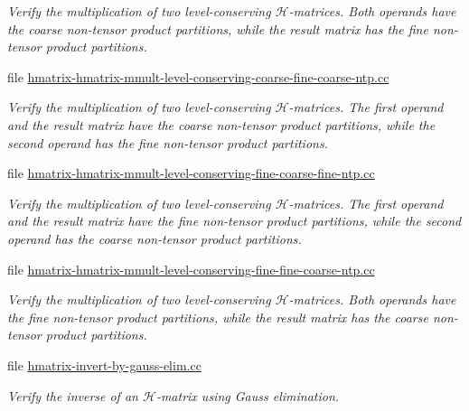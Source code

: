 \begin{DoxyCompactItemize}
\begin{DoxyCompactList}\small\item\em Verify the multiplication of two level-\/conserving $\mathcal{H}$-\/matrices. Both operands have the coarse non-\/tensor product partitions, while the result matrix has the fine non-\/tensor product partitions. \end{DoxyCompactList}\item 
file \hyperlink{hmatrix-hmatrix-mmult-level-conserving-coarse-fine-coarse-ntp_8cc}{hmatrix-\/hmatrix-\/mmult-\/level-\/conserving-\/coarse-\/fine-\/coarse-\/ntp.\+cc}
\begin{DoxyCompactList}\small\item\em Verify the multiplication of two level-\/conserving $\mathcal{H}$-\/matrices. The first operand and the result matrix have the coarse non-\/tensor product partitions, while the second operand has the fine non-\/tensor product partitions. \end{DoxyCompactList}\item 
file \hyperlink{hmatrix-hmatrix-mmult-level-conserving-fine-coarse-fine-ntp_8cc}{hmatrix-\/hmatrix-\/mmult-\/level-\/conserving-\/fine-\/coarse-\/fine-\/ntp.\+cc}
\begin{DoxyCompactList}\small\item\em Verify the multiplication of two level-\/conserving $\mathcal{H}$-\/matrices. The first operand and the result matrix have the fine non-\/tensor product partitions, while the second operand has the coarse non-\/tensor product partitions. \end{DoxyCompactList}\item 
file \hyperlink{hmatrix-hmatrix-mmult-level-conserving-fine-fine-coarse-ntp_8cc}{hmatrix-\/hmatrix-\/mmult-\/level-\/conserving-\/fine-\/fine-\/coarse-\/ntp.\+cc}
\begin{DoxyCompactList}\small\item\em Verify the multiplication of two level-\/conserving $\mathcal{H}$-\/matrices. Both operands have the fine non-\/tensor product partitions, while the result matrix has the coarse non-\/tensor product partitions. \end{DoxyCompactList}\item 
file \hyperlink{hmatrix-invert-by-gauss-elim_8cc}{hmatrix-\/invert-\/by-\/gauss-\/elim.\+cc}
\begin{DoxyCompactList}\small\item\em Verify the inverse of an $\mathcal{H}$-\/matrix using Gauss elimination. \end{DoxyCompactList}\item 

\end{DoxyCompactItemize}
